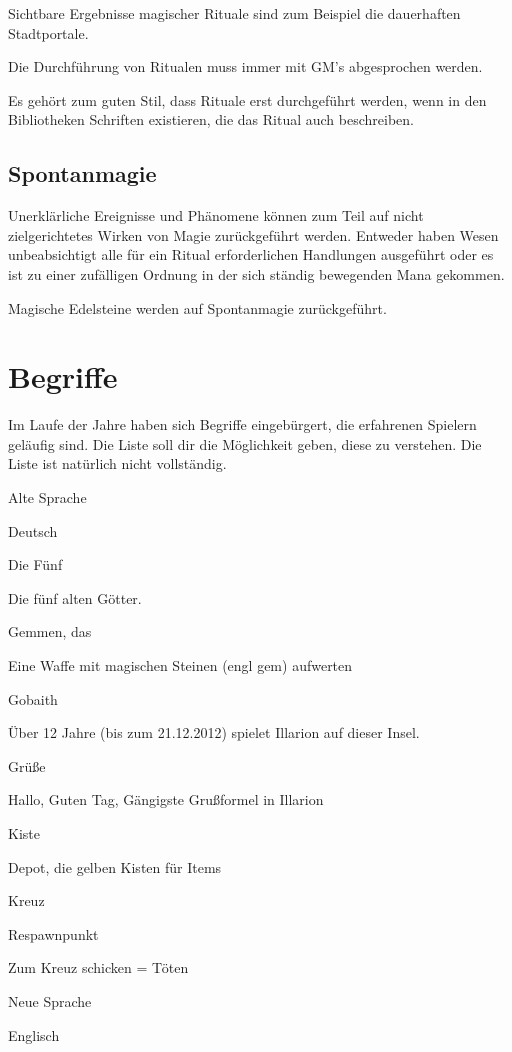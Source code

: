 \documentclass[a4paper,11pt]{book}
\begin{document}
Sichtbare Ergebnisse magischer Rituale sind zum Beispiel die dauerhaften Stadtportale.

Die Durchführung von Ritualen muss immer mit GM’s abgesprochen werden.

Es gehört zum guten Stil, dass Rituale erst durchgeführt werden, wenn in den Bibliotheken Schriften existieren, die das Ritual auch beschreiben.

\subsection{Spontanmagie}

Unerklärliche Ereignisse und Phänomene können zum Teil auf nicht zielgerichtetes Wirken von Magie zurückgeführt werden. Entweder haben Wesen unbeabsichtigt alle für ein Ritual erforderlichen Handlungen ausgeführt oder es ist zu einer zufälligen Ordnung in der sich ständig bewegenden Mana gekommen.

Magische Edelsteine werden auf Spontanmagie zurückgeführt.

\section{Begriffe}

Im Laufe der Jahre haben sich Begriffe eingebürgert, die erfahrenen Spielern geläufig sind. Die Liste soll dir die Möglichkeit geben, diese zu verstehen. Die Liste ist natürlich nicht vollständig.

Alte Sprache

Deutsch

Die Fünf

Die fünf alten Götter.

Gemmen, das

Eine Waffe mit magischen Steinen (engl gem) aufwerten

Gobaith

Über 12 Jahre (bis zum 21.12.2012) spielet Illarion auf dieser Insel.

Grüße

Hallo, Guten Tag, Gängigste Grußformel in Illarion

Kiste

Depot, die gelben Kisten für Items

Kreuz

Respawnpunkt

Zum Kreuz schicken = Töten

Neue Sprache

Englisch
\end{document}
